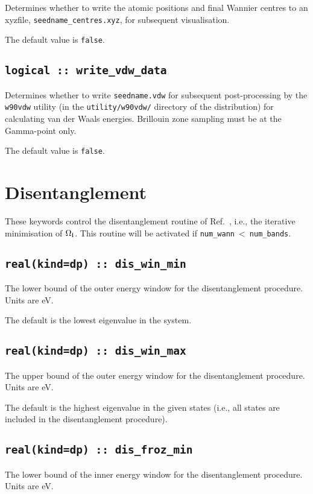 Determines whether to write the atomic positions and 
final Wannier centres to an xyzfile,
\verb#seedname_centres.xyz#, for subsequent
visualisation. 

The default value is \verb#false#.

\subsection[write\_vdw\_data]{\tt logical :: write\_vdw\_data}

Determines whether to write \verb#seedname.vdw# for
subsequent post-processing by the \verb#w90vdw# utility
(in the \verb#utility/w90vdw/# directory of the
distribution) for calculating van der Waals energies.
Brillouin zone sampling must be at the Gamma-point only.

The default value is \verb#false#.

\section{Disentanglement}
These keywords control the disentanglement routine of
Ref.~\cite{souza-prb01}, i.e., the iterative minimisation of $\Omega_{\mathrm{I}}$. This
routine will be activated if \verb#num_wann#$\:<\:$\verb#num_bands#.


\subsection[dis\_win\_min]{\tt real(kind=dp) :: dis\_win\_min}
The lower bound of the outer energy window for the disentanglement
procedure. Units are eV.

The default is the lowest eigenvalue in the system.

\subsection[dis\_win\_max]{\tt real(kind=dp) :: dis\_win\_max}
The upper bound of the outer energy window for the disentanglement
procedure. Units are eV.

The default is the highest eigenvalue in the given states (i.e., all states
are included in the disentanglement procedure).

\subsection[dis\_froz\_min]{\tt real(kind=dp) :: dis\_froz\_min}
The lower bound of the inner energy window for the disentanglement
procedure.  Units are eV.


